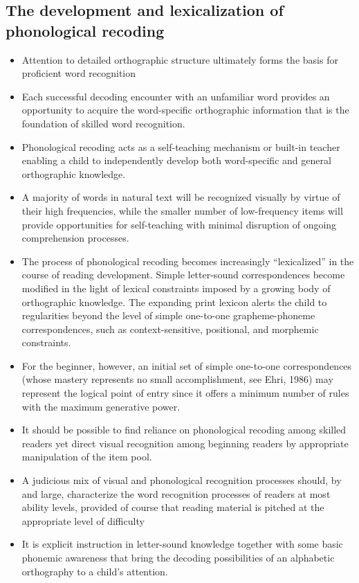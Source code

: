 \documentclass[]{article}
\begin{document}
{		\subsection{The development and lexicalization of phonological recoding}	
		\begin{itemize}
			\item Attention to detailed orthographic structure ultimately forms the basis for proficient word recognition
			\item Each successful decoding encounter with an unfamiliar word provides an opportunity to acquire the word-specific orthographic information that is the foundation of skilled word recognition.
			\item Phonological recoding acts as a self-teaching mechanism or built-in teacher enabling a child to independently develop both word-specific and general orthographic knowledge.
			\item A majority of words in natural text will be recognized visually by virtue of their high frequencies, while the smaller number of low-frequency items will provide opportunities for self-teaching with minimal disruption of ongoing comprehension processes.
			\item The process of phonological recoding becomes increasingly ``lexicalized'' in the course of reading development. Simple letter-sound correspondences become modified in the light of lexical constraints imposed by a growing body of orthographic knowledge. The expanding print lexicon alerts the child to regularities beyond the level of simple one-to-one grapheme-phoneme correspondences, such as context-sensitive, positional, and morphemic constraints.
			\item For the beginner, however, an initial set of simple one-to-one correspondences (whose mastery represents no small accomplishment, see Ehri, 1986) may represent the logical point of entry since it offers a minimum number of rules with the maximum generative power.
			\item It should be possible to find reliance on phonological recoding among skilled readers yet direct visual recognition among beginning readers by appropriate manipulation of the item pool.
			\item A judicious mix of visual and phonological recognition processes should, by and large, characterize the word recognition processes of readers at most ability levels, provided of course that reading material is pitched at the appropriate level of difficulty
			\item It is explicit instruction in letter-sound knowledge together with some basic phonemic awareness that bring the decoding possibilities of an alphabetic orthography to a child's attention.

\end{itemize}}
\end{document}
